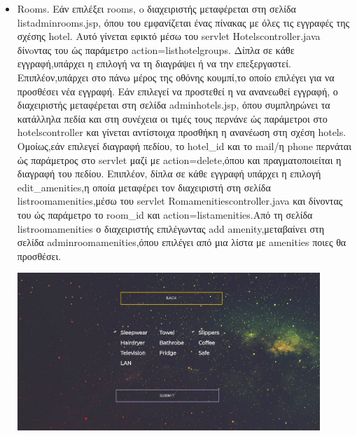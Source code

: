 \documentclass[a4paper,oneside, 11pt]{article}
\begin{document}
\begin{enumerate}
\begin{itemize}
\item Rooms. \bigbreak 
Εάν επιλέξει rooms, o διαχειριστής μεταφέρεται στη σελίδα listadminrooms.jsp, όπου του εμφανίζεται ένας πίνακας με όλες τις εγγραφές της σχέσης hotel. Αυτό γίνεται εφικτό μέσω του servlet Hotelscontroller.java δίνoντας του ώς παράμετρο action=listhotelgroups. Δίπλα σε κάθε εγγραφή,υπάρχει η επιλογή να τη διαγράψει ή να την επεξεργαστεί. Επιπλέον,υπάρχει στο πάνω μέρος της οθόνης κουμπί,το οποίο επιλέγει για να προσθέσει νέα εγγραφή. Εάν επιλεγεί να προστεθεί η να ανανεωθεί εγγραφή, ο διαχειριστής μεταφέρεται στη σελίδα adminhotels.jsp, όπου συμπληρώνει τα κατάλληλα πεδία και στη συνέχεια  οι τιμές τους περνάνε ώς παράμετροι στο hotelscontroller και γίνεται αντίστοιχα προσθήκη η ανανέωση στη σχέση hotels. Ομοίως,εάν επιλεγεί διαγραφή πεδίου, το hotel\_id  και το mail/η phone περνάται ώς παράμετρος στο servlet μαζί με action=delete,όπου και πραγματοποιείται η διαγραφή του πεδίου. \bigbreak
Επιπλέον, δίπλα σε κάθε εγγραφή υπάρχει η επιλογή edit\_amenities,η οποία μεταφέρει   τον διαχειριστή στη σελίδα listroomamenities,μέσω του servlet Romamenitiescontroller.java και δίνοντας του ώς παράμετρο το room\_id και action=listamenities.Από τη σελίδα listroomamenities ο διαχειριστής επιλέγωντας add amenity,μεταβαίνει στη σελίδα adminroomamenities,όπου επιλέγει από μια λίστα με amenities ποιες θα προσθέσει.

\includegraphics[width=0.9\textwidth]{amenities.jpg}
\bigbreak
\end{itemize}


\end{enumerate}






\end{document}
